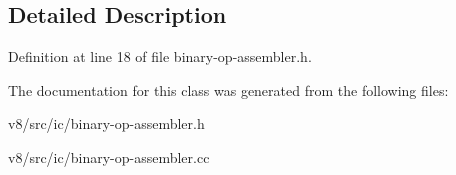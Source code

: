 \subsection{Detailed Description}


Definition at line 18 of file binary-\/op-\/assembler.\+h.



The documentation for this class was generated from the following files\+:\begin{DoxyCompactItemize}
\item 
v8/src/ic/binary-\/op-\/assembler.\+h\item 
v8/src/ic/binary-\/op-\/assembler.\+cc\end{DoxyCompactItemize}
